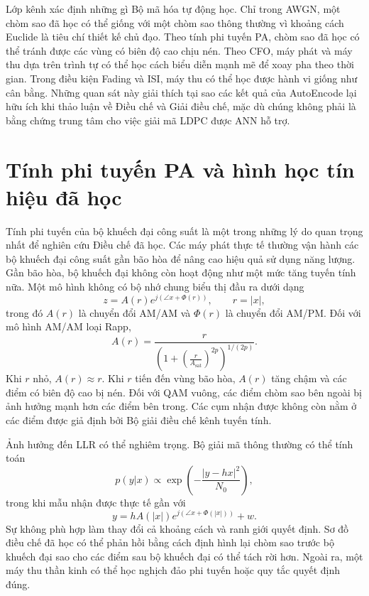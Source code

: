 Lớp kênh xác định những gì Bộ mã hóa tự động học. Chỉ trong AWGN, một chòm sao đã học có thể giống với một chòm sao thông thường vì khoảng cách Euclide là tiêu chí thiết kế chủ đạo. Theo tính phi tuyến PA, chòm sao đã học có thể tránh được các vùng có biên độ cao chịu nén. Theo CFO, máy phát và máy thu dựa trên trình tự có thể học cách biểu diễn mạnh mẽ để xoay pha theo thời gian. Trong điều kiện Fading và ISI, máy thu có thể học được hành vi giống như cân bằng. Những quan sát này giải thích tại sao các kết quả của AutoEncode lại hữu ích khi thảo luận về Điều chế và Giải điều chế, mặc dù chúng không phải là bằng chứng trung tâm cho việc giải mã LDPC được ANN hỗ trợ.

\section{Tính phi tuyến PA và hình học tín hiệu đã học}
Tính phi tuyến của bộ khuếch đại công suất là một trong những lý do quan trọng nhất để nghiên cứu Điều chế đã học. Các máy phát thực tế thường vận hành các bộ khuếch đại công suất gần bão hòa để nâng cao hiệu quả sử dụng năng lượng. Gần bão hòa, bộ khuếch đại không còn hoạt động như một mức tăng tuyến tính nữa. Một mô hình không có bộ nhớ chung biểu thị đầu ra dưới dạng
\begin{equation}
  z=A(r)e^{j(\angle x+\Phi(r))}, \qquad r=|x|,
\end{equation}
trong đó $A(r)$ là chuyển đổi AM/AM và $\Phi(r)$ là chuyển đổi AM/PM. Đối với mô hình AM/AM loại Rapp,
\begin{equation}
  A(r)=\frac{r}{\left(1+\left(\frac{r}{A_{\mathrm{sat}}}\right)^{2p}\right)^{1/(2p)}}.
\end{equation}
Khi $r$ nhỏ, $A(r)\approx r$. Khi $r$ tiến đến vùng bão hòa, $A(r)$ tăng chậm và các điểm có biên độ cao bị nén. Đối với QAM vuông, các điểm chòm sao bên ngoài bị ảnh hưởng mạnh hơn các điểm bên trong. Các cụm nhận được không còn nằm ở các điểm được giả định bởi Bộ giải điều chế kênh tuyến tính.

Ảnh hưởng đến LLR có thể nghiêm trọng. Bộ giải mã thông thường có thể tính toán
\begin{equation}
  p(y|x)\propto \exp\left(-\frac{|y-hx|^2}{N_0}\right),
\end{equation}
trong khi mẫu nhận được thực tế gần với
\begin{equation}
  y=hA(|x|)e^{j(\angle x+\Phi(|x|))}+w.
\end{equation}
Sự không phù hợp làm thay đổi cả khoảng cách và ranh giới quyết định. Sơ đồ điều chế đã học có thể phản hồi bằng cách định hình lại chòm sao trước bộ khuếch đại sao cho các điểm sau bộ khuếch đại có thể tách rời hơn. Ngoài ra, một máy thu thần kinh có thể học nghịch đảo phi tuyến hoặc quy tắc quyết định đúng.

